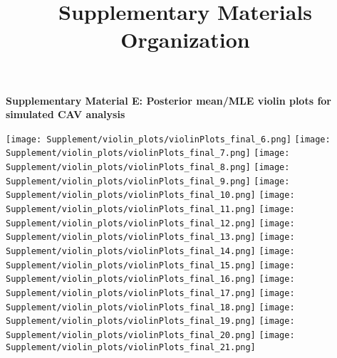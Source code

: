 \documentclass{article}
\title{Supplementary Materials Organization}
\date{\vspace{-5ex}}
\begin{document}
\noindent \textbf{\LARGE Supplementary Material E: Posterior mean/MLE violin plots for simulated CAV analysis}\\
\begin{center}
    \texttt{[image: Supplement/violin\_plots/violinPlots\_final\_6.png]}
    \texttt{[image: Supplement/violin\_plots/violinPlots\_final\_7.png]}
    \texttt{[image: Supplement/violin\_plots/violinPlots\_final\_8.png]}
    \texttt{[image: Supplement/violin\_plots/violinPlots\_final\_9.png]}
    \texttt{[image: Supplement/violin\_plots/violinPlots\_final\_10.png]}
    \texttt{[image: Supplement/violin\_plots/violinPlots\_final\_11.png]}
    \texttt{[image: Supplement/violin\_plots/violinPlots\_final\_12.png]}
    \texttt{[image: Supplement/violin\_plots/violinPlots\_final\_13.png]}
    \texttt{[image: Supplement/violin\_plots/violinPlots\_final\_14.png]}
    \texttt{[image: Supplement/violin\_plots/violinPlots\_final\_15.png]}
    \texttt{[image: Supplement/violin\_plots/violinPlots\_final\_16.png]}
    \texttt{[image: Supplement/violin\_plots/violinPlots\_final\_17.png]}
    \texttt{[image: Supplement/violin\_plots/violinPlots\_final\_18.png]}
    \texttt{[image: Supplement/violin\_plots/violinPlots\_final\_19.png]}
    \texttt{[image: Supplement/violin\_plots/violinPlots\_final\_20.png]}
    \texttt{[image: Supplement/violin\_plots/violinPlots\_final\_21.png]}
\end{center}
\end{document}
